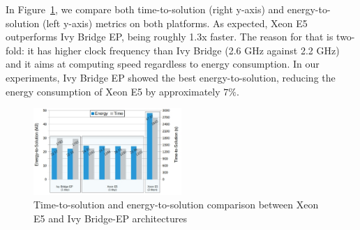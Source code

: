 In Figure~\ref{fig:3}, we compare both time-to-solution (right y-axis)
and  energy-to-solution (left  y-axis) metrics  on both  platforms. As
expected,  Xeon  E5 outperforms  Ivy  Bridge  EP,  being roughly  1.3x
faster.   The  reason  for  that  is two-fold:  it  has  higher  clock
frequency than  Ivy Bridge (2.6  GHz against 2.2  GHz) and it  aims at
computing speed regardless to  energy consumption. In our experiments,
Ivy Bridge EP showed  the best energy-to-solution, reducing the energy
consumption of Xeon E5 by approximately $7\%$.

\begin{figure}[htbf]
  \includegraphics[width=0.5\textwidth]{Figs/Time_E2S_COSMO-ART.eps}
  \caption{Time-to-solution and  energy-to-solution comparison between
    Xeon E5 and Ivy Bridge-EP architectures}
  \label{fig:3}
\end{figure}
